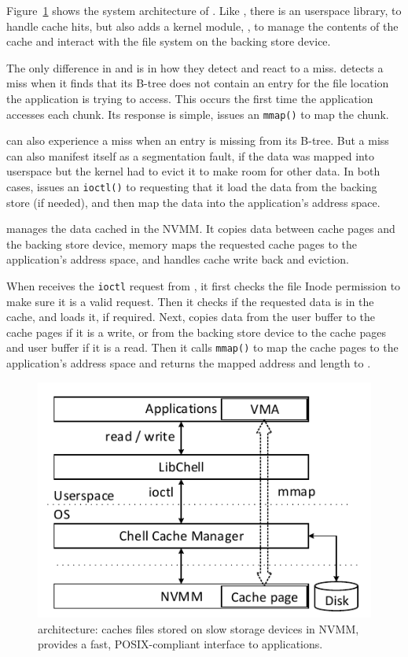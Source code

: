 Figure~\ref{fig:CChellstack} shows the system architecture of \CChell{}.
Like \DAChell{}, there is an userspace library, \lib{} to handle cache
hits, but \CChell{} also adds a kernel module, \drv{}, to
manage the contents of the cache and interact with the file system on the
backing store device.

The only difference in \libd{} and \lib{} is in
how they detect and react to a miss.  \Libd{} detects a miss when it
finds that its B-tree does not contain an entry for the file location the
application is trying to access.  This occurs the first time the application
accesses each chunk.  Its response is simple, issues an \texttt{mmap()} to map
the chunk.

\Lib{} can also experience a miss when an entry is missing from its B-tree.
But a miss can also manifest itself as a segmentation fault, if the data was
mapped into userspace but the kernel had to evict it to make room for other
data.
In both cases, \lib{} issues an \texttt{ioctl()} to \drv{} requesting that
it load the data from the backing store (if needed), and then map the data into
the application's address space.

\Drv{} manages the data cached in the NVMM.
It copies data between cache pages and the backing store device,
memory maps the requested cache pages to the application's address space,
and handles cache write back and eviction.

When \drv{} receives the \texttt{ioctl} request from \lib{},
it first checks the
file Inode permission to make sure it is a valid request.  Then it checks if 
the requested data is in the cache,
and loads it, if required.
Next, \drv{} copies data from the user buffer to the cache pages if it is
a write, or from the backing store device to the cache pages and user buffer if 
it is a read. Then it calls \texttt{mmap()} to map the cache pages to
the application's address space and returns the mapped address and length
to \lib{}.


\begin{figure}
\includegraphics{Figures/Chell-Stack.pdf}
\caption{\CChell{} architecture: \CChell{} caches files stored on slow storage
devices in NVMM, provides a fast, POSIX-compliant interface to applications.}
\label{fig:CChellstack}
\end{figure}

